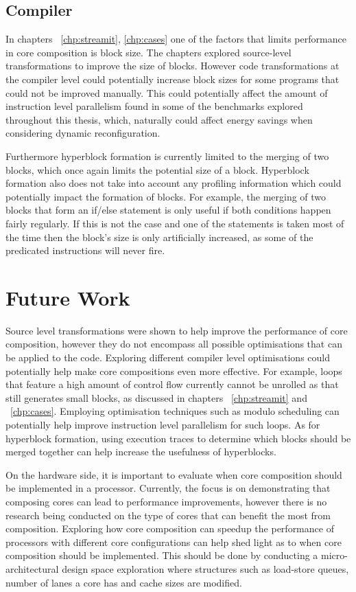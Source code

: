 \subsection{Compiler}
In chapters ~\ref{chp:streamit}, \ref{chp:cases} one of the factors that limits performance in core composition is block size.
The chapters explored source-level transformations to improve the size of blocks.
However code transformations at the compiler level could potentially increase block sizes for some programs that could not be improved manually.
This could potentially affect the amount of instruction level parallelism found in some of the benchmarks explored throughout this thesis, which, naturally could affect energy savings when considering dynamic reconfiguration.

Furthermore hyperblock formation is currently limited to the merging of two blocks, which once again limits the potential size of a block.
Hyperblock formation also does not take into account any profiling information which could potentially impact the formation of blocks.
For example, the merging of two blocks that form an if/else statement is only useful if both conditions happen fairly regularly.
If this is not the case and one of the statements is taken most of the time then the block's size is only artificially increased, as some of the predicated instructions will never fire.


\section{Future Work}

Source level transformations were shown to help improve the performance of core composition, however they do not encompass all possible optimisations that can be applied to the code.
Exploring different compiler level optimisations could potentially help make core compositions even more effective.
For example, loops that feature a high amount of control flow currently cannot be unrolled as that still generates small blocks, as discussed in chapters ~\ref{chp:streamit} and ~\ref{chp:cases}.
Employing optimisation techniques such as modulo scheduling can potentially help improve instruction level parallelism for such loops.
As for hyperblock formation, using execution traces to determine which blocks should be merged together can help increase the usefulness of hyperblocks.

On the hardware side, it is important to evaluate when core composition should be implemented in a processor.
Currently, the focus is on demonstrating that composing cores can lead to performance improvements, however there is no research being conducted on the type of cores that can benefit the most from composition.
Exploring how core composition can speedup the performance of processors with different core configurations can help shed light as to when core composition should be implemented.
This should be done by conducting a micro-architectural design space exploration where structures such as load-store queues, number of lanes a core has and cache sizes are modified.

